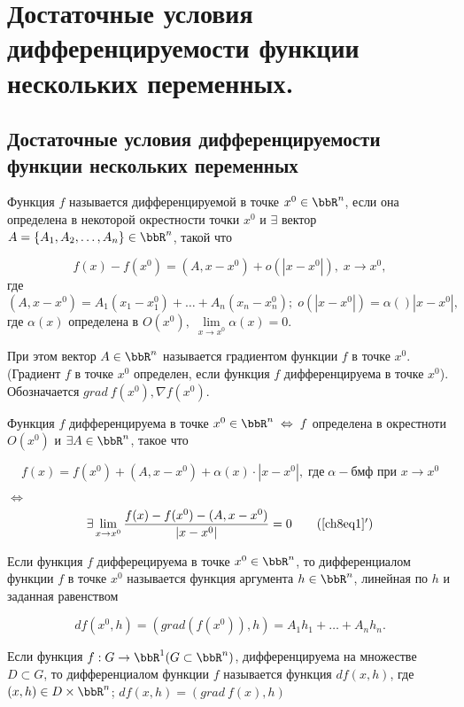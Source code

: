 \chapter[\texorpdfstring{Достаточные условия дифференцируемости функции не\-скольких переменных.}{}]{Достаточные условия дифференцируемости функции нескольких переменных.}
\section[\texorpdfstring{Достаточные условия дифференцируемости функции \\несколь\-ких переменных.}{}]{Достаточные условия дифференцируемости функции нескольких переменных}

\begin{defn}
Функция $f$ называется дифференцируемой в точке $x^0 \in \bbR^n$, если она определена в некоторой окрестности точки $x^0$ и $\exists$ вектор $A = \{ A_1, A_2, \ldots , A_n\} \in \bbR^n$, такой что 

\begin{equation} \label{ch8eq1}
f(x) - f(x^0) = (A, x - x^0) + o(|x - x^0|), \; x \to x^0, 
\end{equation}
где $(A, x - x^0) = A_1(x_1 - x^0_1) + \ldots + A_n(x_n - x^0_n); \; o(|x - x^0|) = \alpha()|x - x^0|,$ где $\alpha(x)$ определена в $O(x^0), \; \lim\limits_{x \to x^0} \alpha(x) = 0$.

При этом вектор $A \in \bbR^n$ называется градиентом функции $f$ в точке $x^0$. (Градиент $f$ в точке $x^0$ определен, если функция $f$ дифференцируема в точке $x^0$). Обозначается $grad \: f(x^0), \nabla f(x^0)$.

Функция $f$ дифференцируема в точке $x^0 \in \bbR^n \; \Leftrightarrow \; f$ определена в окрестноти $O(x^0)$ и $\exists A \in \bbR^n$, такое что 

$$
f(x) = f(x^0) + (A, x - x^0) + \alpha(x) \cdot |x - x^0|, \; \textit{где} \; \alpha - \textit{бмф при } x \to x^0 
$$ 

$\Leftrightarrow \;$
\begin{equation} \label{ch8eq1'}
\exists \lim\limits_{x \to x^0} \frac{f(x) - f(x^0) - (A, x - x^0)}{|x - x^0|} = 0
\tag{\ref{ch8eq1}$'$}
\end{equation}

\end{defn}

\begin{defn}
Если функция $f$ дифферецируема в точке $x^0 \in \bbR^n$, то дифференциалом функции $f$ в точке $x^0$ называется функция аргумента $h \in \bbR^n$, линейная  по $h$ и заданная равенством

$$
df(x^0, h) = (grad(f(x^0)), h) = A_1 h_1 + \ldots + A_n h_n.
$$

Если функция $f: G \to \bbR^1 (G \subset \bbR^n)$, дифференцируема на множестве $D \subset G$, то дифференциалом функции $f$ называется функция $df(x,h)$, где $(x,h) \in D \times \bbR^n$; $df(x,h) = (grad \: f(x), h)$
\end{defn}

